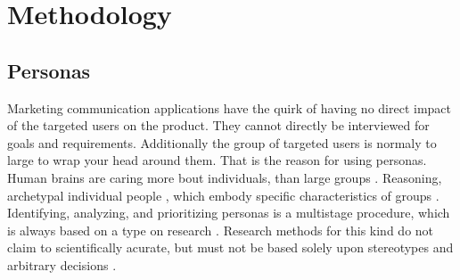 \section{Methodology}
\subsection{Personas}
Marketing communication applications have the quirk of having no direct impact of the targeted users on the product. They cannot directly be interviewed for goals and requirements. Additionally the group of targeted users is normaly to large to wrap your head around them. That is the reason for using personas. Human brains are caring more bout individuals, than large groups \parencite[cf.][]{Platt.2016}. Reasoning, archetypal individual people \parencite[cf.][81-82]{Cooper.2007}, which embody specific characteristics of groups \parencite[cf.][]{Platt.2016}. Identifying, analyzing, and prioritizing personas is a multistage procedure, which is always based on a type on research \parencite[cf.][39]{Robier.2016}. Research methods for this kind do not claim to scientifically acurate, but must not be based solely upon stereotypes and arbitrary decisions \parencite[cf.][82-83]{Cooper.2007}. 
